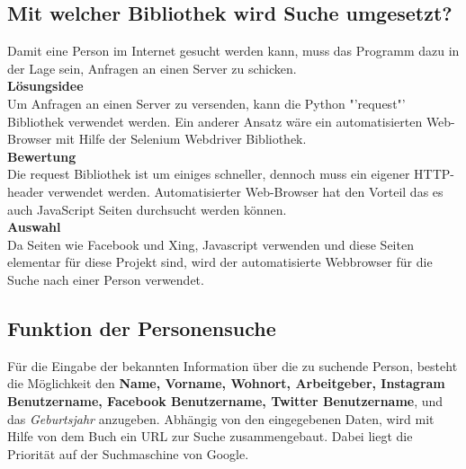 	\subsection{Mit welcher Bibliothek wird Suche umgesetzt?}
	Damit eine Person im Internet gesucht werden kann, muss das Programm dazu in der Lage sein, Anfragen an einen Server zu schicken. \\
	\textbf{Lösungsidee}\\
	Um Anfragen an einen Server zu versenden, kann die Python "'request"' Bibliothek verwendet werden. Ein anderer Ansatz wäre ein automatisierten Web-Browser mit Hilfe der Selenium Webdriver Bibliothek.\\
	\textbf{Bewertung}\\
	Die request Bibliothek ist um einiges schneller, dennoch muss ein eigener HTTP-header verwendet werden. Automatisierter Web-Browser hat den Vorteil das es auch JavaScript Seiten durchsucht werden können.\\
	\textbf{Auswahl}\\
	Da Seiten wie Facebook und Xing, Javascript verwenden und diese Seiten elementar für diese Projekt sind, wird der automatisierte Webbrowser für die Suche nach einer Person verwendet.
	
	\subsection{Funktion der Personensuche}
	Für die Eingabe der bekannten Information über die zu suchende Person, besteht die Möglichkeit den \textbf{Name, Vorname, Wohnort, Arbeitgeber, Instagram Benutzername, Facebook Benutzername, Twitter Benutzername}, und das \textit{Geburtsjahr} anzugeben. Abhängig von den eingegebenen Daten, wird mit Hilfe von dem Buch \cite{Bazzell} ein URL zur Suche zusammengebaut. Dabei liegt die Priorität auf der Suchmaschine von Google.
